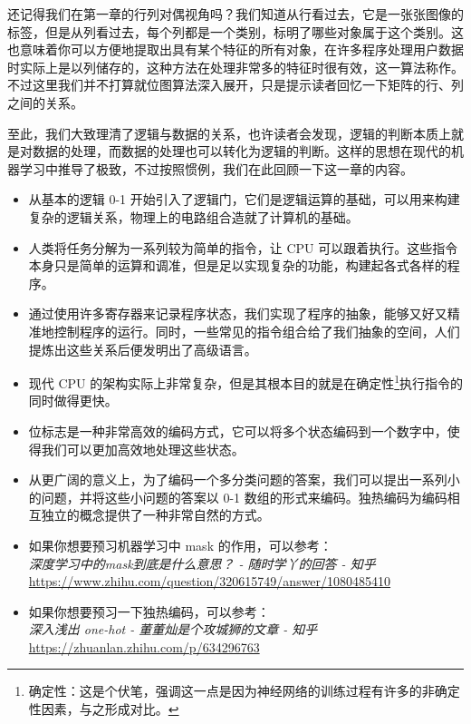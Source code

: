 还记得我们在第一章的行列对偶视角吗？我们知道从行看过去，它是一张张图像的标签，但是从列看过去，每个列都是一个类别，标明了哪些对象属于这个类别。这也意味着你可以方便地提取出具有某个特征的所有对象，在许多程序处理用户数据时实际上是以列储存的，这种方法在处理非常多的特征时很有效，这一算法称作。不过这里我们并不打算就位图算法深入展开，只是提示读者回忆一下矩阵的行、列之间的关系。

至此，我们大致理清了逻辑与数据的关系，也许读者会发现，逻辑的判断本质上就是对数据的处理，而数据的处理也可以转化为逻辑的判断。这样的思想在现代的机器学习中推导了极致，不过按照惯例，我们在此回顾一下这一章的内容。

\begin{itemize}
    \item 从基本的逻辑 0-1 开始引入了逻辑门，它们是逻辑运算的基础，可以用来构建复杂的逻辑关系，物理上的电路组合造就了计算机的基础。
    \item 人类将任务分解为一系列较为简单的指令，让 CPU 可以跟着执行。这些指令本身只是简单的运算和调准，但是足以实现复杂的功能，构建起各式各样的程序。
    \item 通过使用许多寄存器来记录程序状态，我们实现了程序的抽象，能够又好又精准地控制程序的运行。同时，一些常见的指令组合给了我们抽象的空间，人们提炼出这些关系后便发明出了高级语言。
    \item 现代 CPU 的架构实际上非常复杂，但是其根本目的就是在确定性\footnote{确定性：这是个伏笔，强调这一点是因为神经网络的训练过程有许多的非确定性因素，与之形成对比。}执行指令的同时做得更快。
    \item 位标志是一种非常高效的编码方式，它可以将多个状态编码到一个数字中，使得我们可以更加高效地处理这些状态。
    \item 从更广阔的意义上，为了编码一个多分类问题的答案，我们可以提出一系列小的问题，并将这些小问题的答案以 0-1 数组的形式来编码。独热编码为编码相互独立的概念提供了一种非常自然的方式。
\end{itemize}


\begin{tcolorbox}[myrecommendbox, title=推荐阅读, breakable=false]
    \begin{itemize}
        \item 如果你想要预习机器学习中 mask 的作用，可以参考：\\
              \textit{深度学习中的mask到底是什么意思？ - 随时学丫的回答 - 知乎}\\
              \url{https://www.zhihu.com/question/320615749/answer/1080485410}
        \item 如果你想要预习一下独热编码，可以参考：\\
              \textit{深入浅出 one-hot - 董董灿是个攻城狮的文章 - 知乎}\\
              \url{https://zhuanlan.zhihu.com/p/634296763}
    \end{itemize}
\end{tcolorbox}

